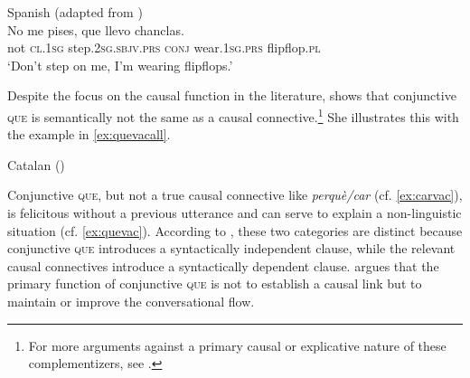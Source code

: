 \ea\label{ex:corrconjill}
		Spanish (adapted from \citealt[229: ex 90]{Corr2016})\\
\gll  No me pises, que llevo chanclas. \\
not \textsc{cl.1sg} step.\textsc{2sg.sbjv.prs} \textsc{conj} wear.\textsc{1sg.prs} {flipflop.\textsc{pl}}\\
\glt `Don’t step on me, I’m wearing flipflops.'
\z


Despite the focus on the causal function in the literature,  \citet{Corr2016} shows that conjunctive \textsc{que} is semantically not the same as a causal connective.\footnote{For more arguments against a primary causal or explicative nature of these complementizers, see .} She illustrates this with the example in \eqref{ex:quevacall}.


\ea\label{ex:quevacall} {Catalan} (\citealt[226: ex 84]{Corr2016})\label{ex:carvac}\\ 
\z
\z

Conjunctive \textsc{que}, but not a true causal connective like \emph{perquè/car} (cf. \ref{ex:carvac}), is felicitous without a previous utterance and can serve to explain a non-linguistic situation (cf. \ref{ex:quevac}).  According to \citet{Corr2016}, these two categories are distinct because  conjunctive \textsc{que} introduces a syntactically independent clause, while the relevant causal connectives introduce a syntactically dependent clause. 
\citet[207]{Corr2016} argues that the primary function of conjunctive \textsc{que} is not to establish a causal link but  to maintain or  improve the conversational flow.

